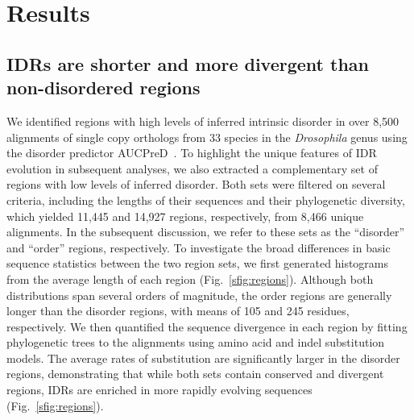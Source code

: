 \section{Results}
\subsection{IDRs are shorter and more divergent than non-disordered regions}
We identified regions with high levels of inferred intrinsic disorder in over 8,500 alignments of single copy orthologs from 33 species in the \textit{Drosophila} genus using the disorder predictor AUCPreD~\cite{Wang2016}. To highlight the unique features of IDR evolution in subsequent analyses, we also extracted a complementary set of regions with low levels of inferred disorder. Both sets were filtered on several criteria, including the lengths of their sequences and their phylogenetic diversity, which yielded 11,445 and 14,927 regions, respectively, from 8,466 unique alignments. In the subsequent discussion, we refer to these sets as the ``disorder'' and ``order'' regions, respectively. To investigate the broad differences in basic sequence statistics between the two region sets, we first generated histograms from the average length of each region (Fig.~\ref{sfig:regions}). Although both distributions span several orders of magnitude, the order regions are generally longer than the disorder regions, with means of 105 and 245 residues, respectively. We then quantified the sequence divergence in each region by fitting phylogenetic trees to the alignments using amino acid and indel substitution models. The average rates of substitution are significantly larger in the disorder regions, demonstrating that while both sets contain conserved and divergent regions, IDRs are enriched in more rapidly evolving sequences (Fig.~\ref{sfig:regions}).

